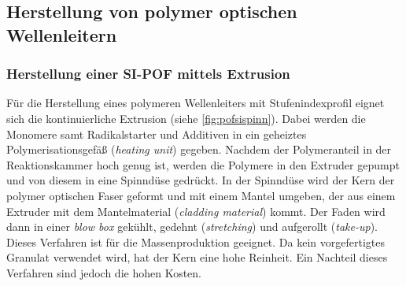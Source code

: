 \subsection{Herstellung von polymer optischen Wellenleitern}
\label{subsec:pofherstellungsverfahren}

\subsubsection{Herstellung einer SI-POF mittels Extrusion}

Für die Herstellung eines polymeren Wellenleiters mit Stufenindexprofil eignet
sich die kontinuierliche Extrusion (siehe \autoref{fig:pofsispinn}). Dabei
werden die Monomere samt Radikalstarter und Additiven in ein geheiztes
Polymerisationsgefäß (\textit{heating unit}) gegeben. Nachdem der Polymeranteil
in der Reaktionskammer hoch genug ist, werden die Polymere in den Extruder
gepumpt und von diesem in eine Spinndüse gedrückt. In der Spinndüse wird der
Kern der polymer optischen Faser geformt und mit einem Mantel umgeben, der aus
einem Extruder mit dem Mantelmaterial (\textit{cladding material}) kommt. Der
Faden wird dann in einer \textit{blow box} gekühlt, gedehnt
(\textit{stretching}) und aufgerollt (\textit{take-up}). Dieses Verfahren ist
für die Massenproduktion geeignet. Da kein vorgefertigtes Granulat verwendet
wird, hat der Kern eine hohe Reinheit. Ein Nachteil dieses Verfahren sind jedoch
die hohen Kosten.

